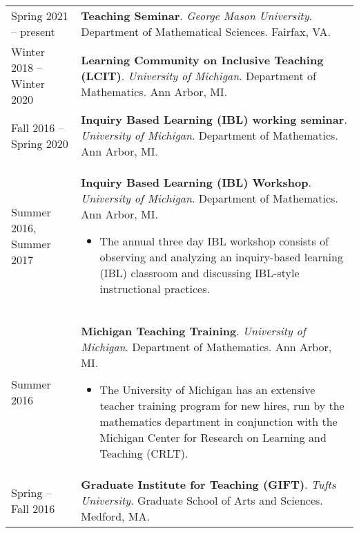 
    \medskip


    \medskip
    
    \begin{center}
    {
    \renewcommand{\arraystretch}{1.2}
    \begin{longtable}{p{}  p{}}
      Spring 2021 -- present & \textbf{Teaching Seminar}. \textit{George Mason University}.  Department of Mathematical Sciences. Fairfax, VA.  \\ 
  Winter 2018 --   Winter 2020 & \textbf{Learning Community on Inclusive Teaching (LCIT)}. \textit{University of Michigan}.  Department of Mathematics. Ann Arbor, MI.  \\ 
  Fall 2016 --   Spring 2020 & \textbf{Inquiry Based Learning (IBL) working seminar}. \textit{University of Michigan}.  Department of Mathematics. Ann Arbor, MI.  \\ 
  Summer 2016,   Summer 2017 & \textbf{Inquiry Based Learning (IBL) Workshop}. \textit{University of Michigan}.  Department of Mathematics. Ann Arbor, MI. 
        \hspace{-1em}

        {\small
        \begin{itemize}
        \setlength{\parindent}{0em}
        \item[] The annual three day IBL workshop consists of observing and analyzing an inquiry-based learning (IBL) classroom and discussing IBL-style instructional practices.
        \end{itemize}
        }
        \vspace{-1em}
         \\ 
  Summer 2016 & \textbf{Michigan Teaching Training}. \textit{University of Michigan}.  Department of Mathematics. Ann Arbor, MI. 
        \hspace{-1em}

        {\small
        \begin{itemize}
        \setlength{\parindent}{0em}
        \item[] The University of Michigan has an extensive teacher training program for new hires, run by the mathematics department in conjunction with the Michigan Center for Research on Learning and Teaching (CRLT).
        \end{itemize}
        }
        \vspace{-1em}
         \\ 
 Spring --   Fall 2016 & \textbf{Graduate Institute for Teaching (GIFT)}. \textit{Tufts University}.  Graduate School of Arts and Sciences. Medford, MA. 
        \hspace{-1em}


\end{longtable}}
\end{center}
